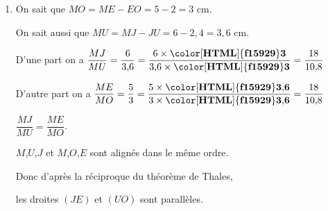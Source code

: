 \begin{corrige}
\begin{enumerate}
\begin{spacing}{1.5}
            \end{spacing}
        \item \begin{spacing}{1.5}
            \begin{minipage}{0.3\linewidth}                
            \end{minipage}
            \hfill
            \begin{minipage}{.65\linewidth} 
                On sait que $MO=ME-EO=5-2=3$ cm.

                On sait aussi que $MU=MJ-JU=6-2{,}4=3{,}6$ cm.

                D'une part on a $\dfrac{MJ}{MU}=\dfrac{6}{3{,}6}=\dfrac{6\times\mathbf{{\color[HTML]{f15929}3}}}{3{,}6\times\mathbf{{\color[HTML]{f15929}3}}}=\dfrac{18}{10{,}8}$

                D'autre part on a $\dfrac{ME}{MO}=\dfrac{5}{3}=\dfrac{5\times\mathbf{{\color[HTML]{f15929}3{,}6}}}{3\times\mathbf{{\color[HTML]{f15929}3{,}6}}}=\dfrac{18}{10{,}8}$

                $\dfrac{MJ}{MU}=\dfrac{ME}{MO}$.

                $M$,$U$,$J$ et $M$,$O$,$E$ sont alignés dans le même ordre.

                Donc d'après la réciproque du théorème de Thales,
                
                les droites $(JE)$ et $(UO)$ sont parallèles.
                
            \end{minipage} 
            \end{spacing}
    \end{enumerate}
\end{corrige}

